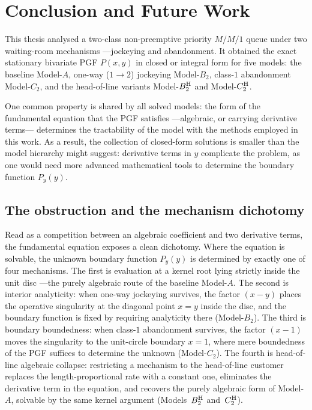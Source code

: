 \section{Conclusion and Future Work}\label{sec:conclusion}

This thesis analysed a two-class non-preemptive priority $M/M/1$ queue under two waiting-room mechanisms ---jockeying and abandonment. It obtained the exact stationary bivariate PGF $P(x,y)$ in closed or integral form for five models: the baseline Model-$A$, one-way ($1\to2$) jockeying Model-$B_2$, class-$1$ abandonment Model-$C_2$, and the head-of-line variants Model-$B_2^{\mathrm{H}}$ and Model-$C_2^{\mathrm{H}}$.

One common property is shared by all solved models: the form of the fundamental equation that the PGF satisfies ---algebraic, or carrying derivative terms--- determines the tractability of the model with the methods employed in this work. As a result, the collection of closed-form solutions is smaller than the model hierarchy might suggest: derivative terms in $y$ complicate the problem, as one would need more advanced mathematical tools to determine the boundary function $P_y(y)$.


\subsection{The obstruction and the mechanism dichotomy}



Read as a competition between an algebraic coefficient and two derivative terms, the fundamental equation exposes a clean dichotomy. Where the equation is solvable, the unknown boundary function $P_y(y)$ is determined by exactly one of four mechanisms. The first is evaluation at a kernel root lying strictly inside the unit disc ---the purely algebraic route of the baseline Model-$A$. The second is interior analyticity: when one-way jockeying survives, the factor $(x-y)$ places the operative singularity at the diagonal point $x=y$ inside the disc, and the boundary function is fixed by requiring analyticity there (Model-$B_2$). The third is boundary boundedness: when class-$1$ abandonment survives, the factor $(x-1)$ moves the singularity to the unit-circle boundary $x=1$, where mere boundedness of the PGF suffices to determine the unknown (Model-$C_2$). The fourth is head-of-line algebraic collapse: restricting a mechanism to the head-of-line customer replaces the length-proportional rate with a constant one, eliminates the derivative term in the equation, and recovers the purely algebraic form of Model-$A$, solvable by the same kernel argument (Models~$B_2^{\mathrm{H}}$ and~$C_2^{\mathrm{H}}$).

